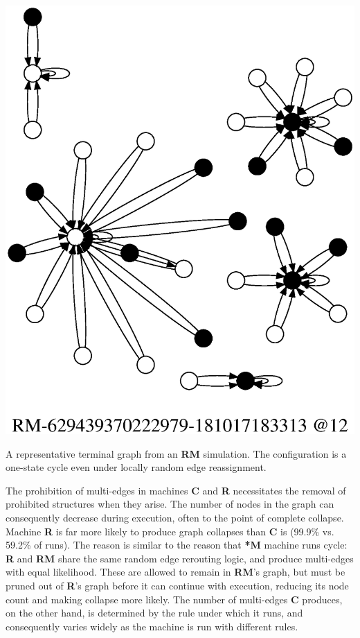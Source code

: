 \documentclass{tufte-handout}
\begin{document}
{\begin{marginfigure}
\includegraphics{terminal_RM_graph.ps}
\caption{A representative terminal graph from an \textbf{RM} simulation. The
configuration is a one-state cycle even under locally random edge reassignment.}
\label{fig:TerminalRMGraph}
\end{marginfigure}

The prohibition of multi-edges in machines \textbf{C} and \textbf{R}
necessitates the removal of prohibited structures when they arise. The
number of nodes in the graph can consequently decrease during execution,
often to the point of complete collapse.
Machine \textbf{R} is far more likely to produce graph collapses than
\textbf{C} is (99.9\% vs. 59.2\% of runs). The reason is similar to the reason
that \textbf{*M} machine runs cycle: \textbf{R} and \textbf{RM} share the same
random edge rerouting logic, and produce multi-edges with equal likelihood. These are allowed to
remain in \textbf{RM}'s graph, but must be pruned out of \textbf{R}'s graph
before it can continue with execution, reducing its node count and making collapse
more likely. The number of multi-edges \textbf{C} produces, on the other hand,
is determined by the rule under which it runs, and consequently varies widely as
the machine is run with different rules.

}
\end{document}
